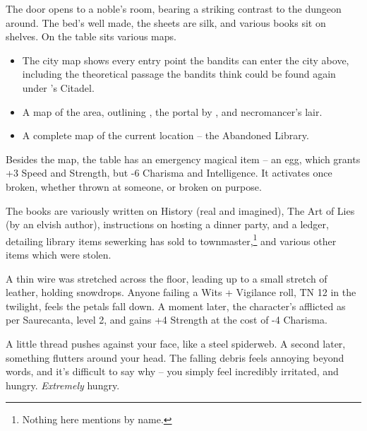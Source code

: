 \begin{multicols}{2}

\begin{boxtext}
	The door opens to a noble's room, bearing a striking contrast to the dungeon around.  The bed's well made, the sheets are silk, and various books sit on shelves.  On the table sits various maps.
\end{boxtext}

\begin{itemize}

	\item{The city map shows every entry point the bandits can enter the city above, including the theoretical passage the bandits think could be found again under 's Citadel.}

	\item{A map of the area, outlining , the portal by , and \gls{necromancer}'s lair.}

	\item{A complete map of the current location -- the Abandoned Library.}

\end{itemize}

Besides the map, the table has an emergency magical item -- an egg, which grants +3 Speed and Strength, but -6 Charisma and Intelligence.
It activates once broken, whether thrown at someone, or broken on purpose.

The books are variously written on History (real and imagined), The Art of Lies (by an elvish author), instructions on hosting a dinner party, and a ledger, detailing library items \gls{sewerking} has sold to \gls{townmaster},\footnote{Nothing here mentions  by name.} and various other items which were stolen.


A thin wire was stretched across the floor, leading up to a small stretch of leather, holding snowdrops.  Anyone failing a Wits + Vigilance roll, TN 12 in the twilight, feels the petals fall down.  A moment later, the character's afflicted as per Saurecanta, level 2, and gains +4 Strength at the cost of -4 Charisma.

\begin{boxtext}

	A little thread pushes against your face, like a steel spiderweb.
	A second later, something flutters around your head.
	The falling debris feels annoying beyond words, and it's difficult to say why -- you simply feel incredibly irritated, and hungry.
	\emph{Extremely} hungry.


\end{boxtext}
\end{multicols}
